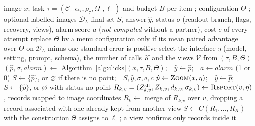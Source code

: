 \begin{algorithm*}[t]
\caption{FSR default reporting pipeline. Tags give the source of each input:  the user's task specification and budget,  the shipped configuration file,  optional labelled images; everything else is computed from the current responses. All calls append their response status and incurred cost to a shared execution trace; every return includes the accumulated trace and its cost $c$. A missing click is represented by an empty set and an explicit no-point status. Comments name the step paragraphs of Section~\ref{sec:method}.}\label{alg:pipeline}
\small
\begin{algorithmic}[1]
\Require image $x$; task $\tau=(\mathcal{C}_\tau,\alpha_\tau,\rho_\tau,\Omega_\tau,\ell_\tau)$ and budget $B$ per item ; configuration $\Theta$ ; optional labelled images $\mathcal{D}_L$ 
\Ensure final set $S$, answer $\hat y$, status $\sigma$ (readout branch, flags, recovery, views), alarm score $a$ (\emph{not computed} without a partner), cost $c$ of every attempt
 
  \State replace $\Theta$ by a menu configuration only if its mean paired advantage over $\Theta$ on $\mathcal{D}_L$ minus one standard error is positive
\EndIf
\State select the interface $\eta$ (model, setting, prompt, schema), the number of calls $K$ and the views $\mathcal{V}$ from $(\tau,B,\Theta)$ 
    \State $(\hat p,\sigma,\mathit{alarm})\gets$ Algorithm~\ref{alg:clicks}$(x,\tau,B,\Theta)$;\ \ $\hat y\gets\hat p$;\ \ $a\gets\mathit{alarm}$ (1 or 0)
    \State $S\gets\{\hat p\}$, or $\varnothing$ if there is no point;\ \ \Return $S,\hat y,\sigma,a,c$
  \EndIf
  \State $\hat p\gets\textsc{Zoom}(x,\eta)$;\ \ $\hat y\gets\hat p$;\ \ $S\gets\{\hat p\}$, or $\varnothing$ with status no point 
\Else
   
    \State $R_{k,v}=(Z^{\mathrm{all}}_{k,v},Z_{k,v},d_{k,v},\sigma_{k,v})\gets\textsc{Report}(v,\eta)$, records mapped to image coordinates 
  \EndFor
  \State $R_k\gets$ merge of $R_{k,v}$ over $v$, dropping a record associated with one already kept from another view
  \State $S\gets C(R_1,\dots,R_K)$ with the construction $\Theta$ assigns to $\ell_\tau$; a view confirms only records inside it 

\end{algorithmic}
\end{algorithm*}
